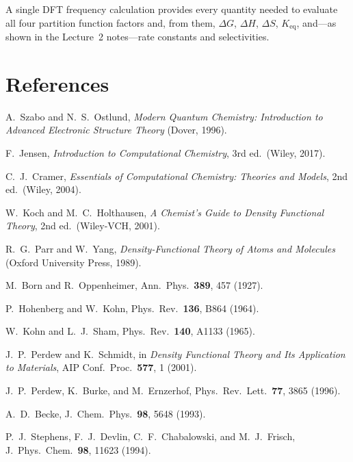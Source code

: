 \documentclass[11pt]{article}
\numberwithin{equation}{section}
\begin{document}
A single DFT frequency calculation provides every quantity needed to evaluate all four partition function factors and, from them, $\Delta G$, $\Delta H$, $\Delta S$, $K_\text{eq}$, and---as shown in the Lecture~2 notes---rate constants and selectivities.


\section*{References}

\begin{enumerate}[label={[\arabic*]},leftmargin=*]
 A.\ Szabo and N.\ S.\ Ostlund, \textit{Modern Quantum Chemistry: Introduction to Advanced Electronic Structure Theory} (Dover, 1996).

 F.\ Jensen, \textit{Introduction to Computational Chemistry}, 3rd ed.\ (Wiley, 2017).

 C.\ J.\ Cramer, \textit{Essentials of Computational Chemistry: Theories and Models}, 2nd ed.\ (Wiley, 2004).

 W.\ Koch and M.\ C.\ Holthausen, \textit{A Chemist's Guide to Density Functional Theory}, 2nd ed.\ (Wiley-VCH, 2001).

 R.\ G.\ Parr and W.\ Yang, \textit{Density-Functional Theory of Atoms and Molecules} (Oxford University Press, 1989).

 M.\ Born and R.\ Oppenheimer, Ann.\ Phys.\ \textbf{389}, 457 (1927).

 P.\ Hohenberg and W.\ Kohn, Phys.\ Rev.\ \textbf{136}, B864 (1964).

 W.\ Kohn and L.\ J.\ Sham, Phys.\ Rev.\ \textbf{140}, A1133 (1965).

 J.\ P.\ Perdew and K.\ Schmidt, in \textit{Density Functional Theory and Its Application to Materials}, AIP Conf.\ Proc.\ \textbf{577}, 1 (2001).

 J.\ P.\ Perdew, K.\ Burke, and M.\ Ernzerhof, Phys.\ Rev.\ Lett.\ \textbf{77}, 3865 (1996).

 A.\ D.\ Becke, J.\ Chem.\ Phys.\ \textbf{98}, 5648 (1993).

 P.\ J.\ Stephens, F.\ J.\ Devlin, C.\ F.\ Chabalowski, and M.\ J.\ Frisch, J.\ Phys.\ Chem.\ \textbf{98}, 11623 (1994).


\end{enumerate}
\end{document}

